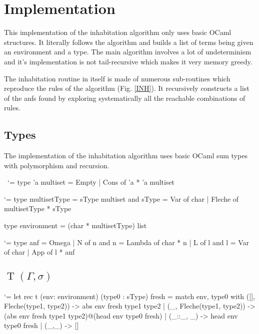 \documentclass{article}
\let\origlstlisting=\lstlisting
\let\endoriglstlisting=\endlstlisting
\renewenvironment{lstlisting}
{\mathcode`\-=\hyphenmathcode
    \everymath{}\mathsurround=0pt\origlstlisting}
{\endoriglstlisting}
\DeclareMathOperator{\iT}{T}
\begin{document}
\section{Implementation}
This implementation of the inhabitation algorithm only uses basic OCaml structures. It literally follows the algorithm and builds a list of terms being given an environment and a type. The main algorithm involves a lot of undeterminism and it's implementation is not tail-recursive which makes it very memory greedy.

The inhabitation routine in itself  is made of numerous sub-routines which reproduce the rules of the algorithm (Fig. \ref{INH}). It recursively constructs a list of the anfs found by exploring systematically all the reachable combinations of rules.

\subsection{Types}
The implementation of the inhabitation algorithm uses basic OCaml sum types with polymorphism and recursion. 

\
\begin{lstlisting}[caption={Multisets}]
type 'a multiset =
  Empty
| Cons of 'a * 'a multiset
\end{lstlisting}

\begin{lstlisting}[caption={Intersection types and environments}]
type multisetType = 
  sType multiset
and sType = 
  Var of char
| Fleche of multisetType * sType

type environment = (char * multisetType) list
\end{lstlisting}

\begin{lstlisting}[caption={Approximate normal forms}]
type anf = 
  Omega
| N of n
and n = 
  Lambda of char * n
| L of l
and l =
  Var of char
| App of l * anf
\end{lstlisting}


\subsection{$\iT(\Gamma, \sigma)$}
    
\begin{lstlisting}
let rec t (env: environment) (type0 : sType) fresh =
match env, type0 with
  ([], Fleche(type1, type2)) -> 
        abs env fresh type1 type2
  | (_, Fleche(type1, type2)) -> 
        (abs env fresh type1 type2)@(head env type0 fresh)
  | (_::_, _) -> head env type0 fresh
  | (_,_) -> []
\end{lstlisting}
\end{document}
